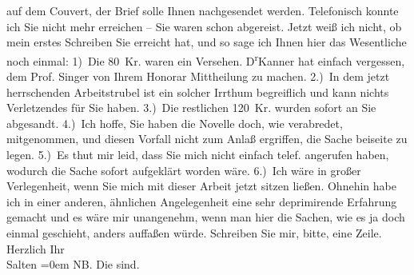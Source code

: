 \begin{ledgroupsized}[t]{13cm}
               auf dem Couvert, der Brief solle Ihnen nachgesendet werden. Telefonisch konnte ich
               Sie nicht mehr erreichen – Sie waren schon abgereist. Jetzt weiß ich nicht, ob mein
               erstes Schreiben Sie erreicht hat, und so sage ich Ihnen hier das Wesentliche noch
               einmal: 1) Die 80 Kr. waren ein Versehen. D\textsuperscript{r}Kanner hat einfach vergessen, dem Prof. Singer von Ihrem Honorar Mittheilung zu machen.
               2.) In dem jetzt herrschenden Arbeitstrubel ist ein solcher Irrthum begreiflich und
               kann nichts Verletzendes für Sie haben. 3.) Die restlichen 120 Kr. wurden sofort an
               Sie abgesandt. 4.) Ich hoffe, Sie haben die Novelle doch, wie verabredet, mitgenommen, und diesen
               Vorfall nicht zum Anlaß ergriffen, die Sache beiseite zu legen. 5.) Es thut mir leid,
               dass Sie mich nicht einfach telef. angerufen haben, wodurch die Sache sofort
               aufgeklärt worden wäre. 6.) Ich wäre in großer Verlegenheit, wenn Sie mich mit dieser
               Arbeit jetzt sitzen ließen. \pend
           \pstart
           Ohnehin habe ich in einer anderen, ähnlichen Angelegenheit eine sehr deprimirende
               Erfahrung gemacht und es wäre mir unangenehm, wenn man hier die Sachen, wie es ja
               doch einmal geschieht, anders auffaßen würde. Schreiben Sie mir, bitte, eine Zeile. \pend
           \pstart
           Herzlich Ihr {\\[\baselineskip]}\spacefill\mbox{Salten}\pend
           \leftskip=0em{}\pstart
           \noindent{}NB. Die \label{K_L03334-3333v}\label{K_L03334-3333h} sind. \pend
           
         
         \endnumbering{}\end{ledgroupsized}\begin{anhang}\end{anhang}\newcommand{\dateiname}{L03334}\newcommand{\titel}{Felix Salten an Arthur Schnitzler, 4. 9. 1902}\newcommand{\editorInnen}{Martin Anton Müller und Laura Untner}
      